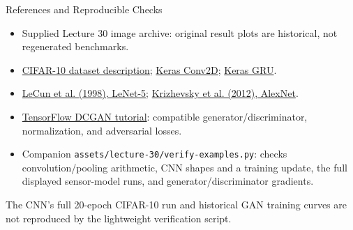 \documentclass[aspectratio=169,10pt]{beamer}
\begin{document}
\appendix
\begin{frame}{References and Reproducible Checks}
\small
\begin{itemize}
 \item Supplied Lecture 30 image archive: original result plots are historical, not regenerated benchmarks.
 \item \href{https://www.cs.toronto.edu/\string~kriz/cifar.html}{CIFAR-10 dataset description}; \href{https://keras.io/api/layers/convolution_layers/convolution2d/}{Keras Conv2D}; \href{https://keras.io/api/layers/recurrent_layers/gru/}{Keras GRU}.
 \item \href{https://yann.lecun.com/exdb/publis/pdf/lecun-98.pdf}{LeCun et al. (1998), LeNet-5}; \href{https://papers.neurips.cc/paper/2012/hash/c399862d3b9d6b76c8436e924a68c45b-Abstract.html}{Krizhevsky et al. (2012), AlexNet}.
 \item \href{https://www.tensorflow.org/tutorials/generative/dcgan}{TensorFlow DCGAN tutorial}: compatible generator/discriminator, normalization, and adversarial losses.
 \item Companion \texttt{assets/lecture-30/verify-examples.py}: checks convolution/pooling arithmetic, CNN shapes and a training update, the full displayed sensor-model runs, and generator/discriminator gradients.
\end{itemize}
\begin{keyidea}The CNN's full 20-epoch CIFAR-10 run and historical GAN training curves are not reproduced by the lightweight verification script.\end{keyidea}
\end{frame}
\end{document}
